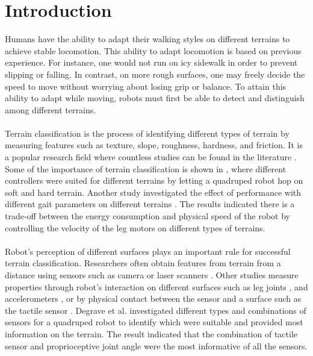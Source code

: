 \documentclass[USenglish]{ifimaster}  %
\begin{document}
	

\mainmatter{}
\pagestyle{MyStyle}
\chapter{Introduction}                  %
Humans have the ability to adapt their walking styles on different terrains to achieve stable locomotion. This ability to adapt locomotion is based on previous experience. For instance, one would not run on icy sidewalk in order to prevent slipping or falling. In contrast, on more rough surfaces, one may freely decide the speed to move without worrying about losing grip or balance. To attain this ability to adapt while moving, robots must first be able to detect and distinguish among different terrains.
\\
\\
Terrain classification is the process of identifying different types of terrain by measuring features such as texture, slope, roughness, hardness, and friction. It is a popular research field where countless studies can be found in the literature  \cite{Giguere06environmentidentification,Giguere2009,6386243,6569179,4399500,littleDog}. Some of the importance of terrain classification is shown in \cite{7487541}, where different controllers were suited for different terrains by letting a quadruped robot hop on soft and hard terrain. Another study investigated the effect of performance with different gait parameters on different terrains \cite{6569179}. The results indicated there is a trade-off between the energy consumption and physical speed of the robot by controlling the velocity of the leg motors on different types of terrains.
\\
\\ 
Robot's perception of different surfaces plays an important rule for successful terrain classification. Researchers often obtain features from terrain from a distance using sensors such as camera \cite{littleDog} or laser scanners \cite{4651026}. Other studies measure properties through robot's interaction on different surfaces such as leg joints \cite{26b23e912c654fe4b7478fd910130195}, and accelerometers \cite{DBLP:conf/emcr/WeissFSZ07}, 
or by physical contact between the sensor and a surface such as the tactile sensor \cite{6784609,walastactile,7397881}. Degrave et al. \cite{6784609} investigated different types and combinations of sensors for a quadruped robot to identify which were suitable and provided most information on the terrain. The result indicated that the combination of tactile sensor and proprioceptive joint angle were the most informative of all the sensors. 
\end{document}
